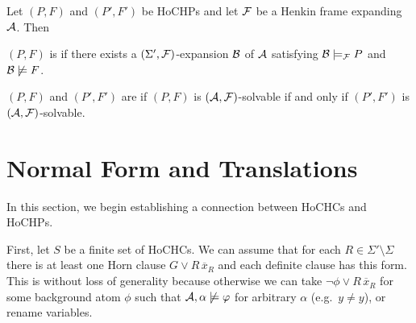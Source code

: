 \documentclass[a4paper,twoside,notitlepage,openright,11pt]{report}
\begin{document}
\begin{definition}
  Let $(P,F)$ and $(P',F')$ be HoCHPs and let $\mathcal F$ be a Henkin frame expanding $\mathcal A$. Then
  \begin{thmlist}
  \item $(P,F)$ is  if there exists a $(\Sigma',\mathcal F)$-expansion $\mathcal B$ of $\mathcal A$ satisfying $\mathcal B\models_\mathcal F P$ and $\mathcal B\not\models F$. 
  \item $(P,F)$ and $(P',F')$ are  if $(P,F)$ is $(\mathcal A,\mathcal F)$-solvable if and only if $(P',F')$ is $(\mathcal A,\mathcal F)$-solvable.
  \end{thmlist}
\end{definition}

\section{Normal Form and Translations}
\label{sec:nftrans}
In this section, we begin establishing a connection between HoCHCs and HoCHPs.

First, let $S$ be a finite set of HoCHCs. We can assume that for each $R\in\Sigma'\setminus\Sigma$ there is at least one Horn clause $G\lor R\,\overline x_R$ and each definite clause has this form. This is without loss of generality because otherwise we can take $\neg \phi\lor R\,\overline x_R$ for some background atom $\phi$ such that $\mathcal A,\alpha\not\models\varphi$ for arbitrary $\alpha$ (e.g.\ $y\neq y$), or rename variables.
\end{document}
